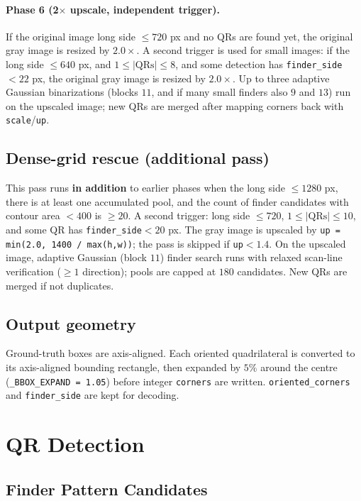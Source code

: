 \documentclass[11pt,a4paper]{article}
\begin{document}
\paragraph{Phase 6 (2$\times$ upscale, independent trigger).}
If the original image long side $\le 720$ px and no QRs are found yet, the
original gray image is resized by $2.0\times$. A second trigger is used for
small images: if the long side $\le 640$ px, and
$1\le|\text{QRs}|\le 8$, and some detection has
\texttt{finder\_side}$<22$ px, the original gray image is resized by
$2.0\times$. Up to three adaptive Gaussian binarizations (blocks $11$, and
if many small finders also $9$ and $13$) run on the upscaled image; new QRs
are merged after mapping corners back with \texttt{scale}/\texttt{up}.

\subsection{Dense-grid rescue (additional pass)}

This pass runs \textbf{in addition} to earlier phases when the long side
$\le 1280$ px, there is at least one accumulated pool, and the count of
finder candidates with contour area $<400$ is $\ge 20$. A second trigger:
long side $\le 720$, $1\le|\text{QRs}|\le 10$, and some QR has
\texttt{finder\_side}$<20$ px. The gray image is upscaled by
\texttt{up = min(2.0, 1400 / max(h,w))}; the pass is skipped if
\texttt{up}$<1.4$. On the upscaled image, adaptive Gaussian (block $11$)
finder search runs with relaxed scan-line verification ($\ge 1$ direction);
pools are capped at $180$ candidates. New QRs are merged if not duplicates.

\subsection{Output geometry}

Ground-truth boxes are axis-aligned. Each oriented quadrilateral is
converted to its axis-aligned bounding rectangle, then expanded by
$5\%$ around the centre (\texttt{\_BBOX\_EXPAND = 1.05}) before integer
\texttt{corners} are written. \texttt{oriented\_corners} and
\texttt{finder\_side} are kept for decoding.

\section{QR Detection}

\subsection{Finder Pattern Candidates}
\end{document}
